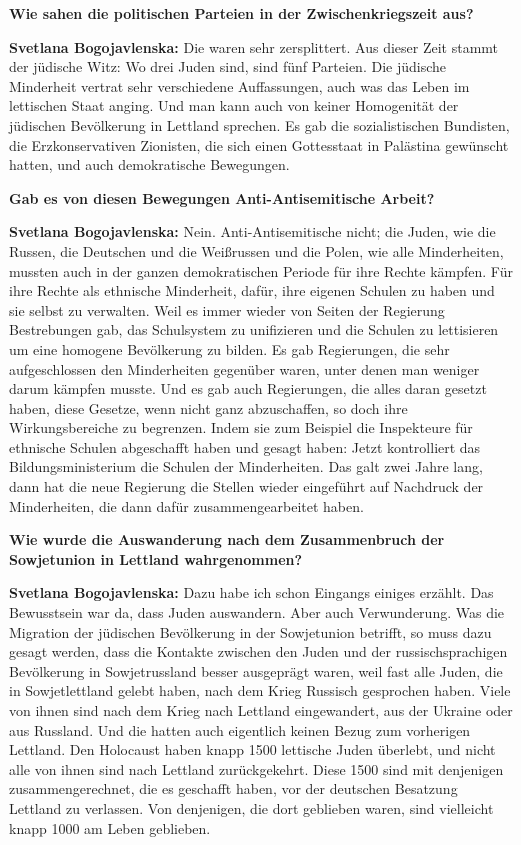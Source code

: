 \textbf{Wie sahen die politischen Parteien in der Zwischenkriegszeit aus?}

\textbf{Svetlana Bogojavlenska:}  Die waren sehr zersplittert. Aus dieser Zeit stammt der jüdische Witz: Wo drei Juden sind, sind fünf Parteien. Die jüdische Minderheit vertrat sehr verschiedene Auffassungen, auch was das Leben im lettischen Staat anging. Und man kann auch von keiner Homogenität der jüdischen Bevölkerung in Lettland sprechen. Es gab die sozialistischen Bundisten, die Erzkonservativen Zionisten, die sich einen Gottesstaat in Palästina gewünscht hatten, und auch demokratische Bewegungen.

\textbf{Gab es von diesen Bewegungen Anti-Antisemitische Arbeit?}

\textbf{Svetlana Bogojavlenska:}  Nein. Anti-Antisemitische nicht; die Juden, wie die Russen, die Deutschen und die Weißrussen und die Polen, wie alle Minderheiten, mussten auch in der ganzen demokratischen Periode für ihre Rechte kämpfen. Für ihre Rechte als ethnische Minderheit, dafür, ihre eigenen Schulen zu haben und sie selbst zu verwalten. Weil es immer wieder von Seiten der Regierung Bestrebungen gab, das Schulsystem zu unifizieren und die Schulen zu lettisieren um eine homogene Bevölkerung zu bilden. Es gab Regierungen, die sehr aufgeschlossen den Minderheiten gegenüber waren, unter denen man weniger darum kämpfen musste. Und es gab auch Regierungen, die alles daran gesetzt haben, diese Gesetze, wenn nicht ganz abzuschaffen, so doch ihre Wirkungsbereiche zu begrenzen. Indem sie zum Beispiel die Inspekteure für ethnische Schulen abgeschafft haben und gesagt haben: Jetzt kontrolliert das Bildungsministerium die Schulen der Minderheiten. Das galt zwei Jahre lang, dann hat die neue Regierung die Stellen wieder eingeführt auf Nachdruck der Minderheiten, die dann dafür zusammengearbeitet haben.

\textbf{Wie wurde die Auswanderung nach dem Zusammenbruch der Sowjetunion in Lettland wahrgenommen?}

\textbf{Svetlana Bogojavlenska:}  Dazu habe ich schon Eingangs einiges erzählt. Das Bewusstsein war da, dass Juden auswandern. Aber auch Verwunderung. Was die Migration der jüdischen Bevölkerung in der Sowjetunion betrifft, so muss dazu gesagt werden, dass die Kontakte zwischen den Juden und der russischsprachigen Bevölkerung in Sowjetrussland besser ausgeprägt waren, weil fast alle Juden, die in Sowjetlettland gelebt haben, nach dem Krieg Russisch gesprochen haben. Viele von ihnen sind nach dem Krieg nach Lettland eingewandert, aus der Ukraine oder aus Russland. Und die hatten auch eigentlich keinen Bezug zum vorherigen Lettland. Den Holocaust haben knapp 1500 lettische Juden überlebt, und nicht alle von ihnen sind nach Lettland zurückgekehrt. Diese 1500 sind mit denjenigen zusammengerechnet, die es geschafft haben, vor der deutschen Besatzung Lettland zu verlassen. Von denjenigen, die dort geblieben waren, sind vielleicht knapp 1000 am Leben geblieben.

